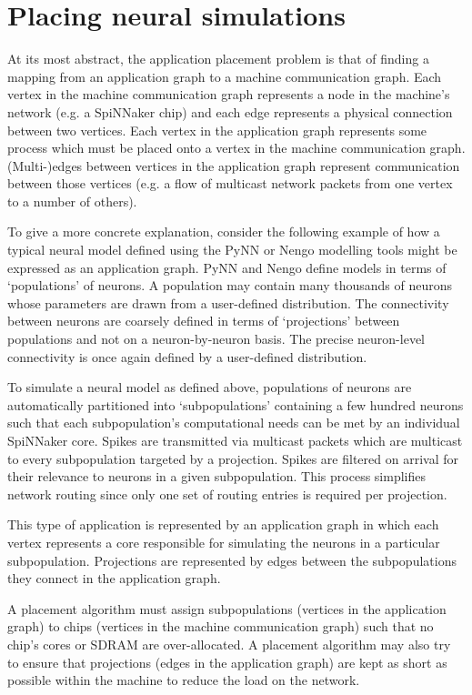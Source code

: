 	\section{Placing neural simulations}
		
		At its most abstract, the application placement problem is that of finding
		a mapping from an application graph to a machine communication graph. Each
		vertex in the machine communication graph represents a node in the
		machine's network (e.g. a SpiNNaker chip) and each edge represents a
		physical connection between two vertices. Each vertex in the application
		graph represents some process which must be placed onto a vertex in the
		machine communication graph. (Multi-)edges between vertices in the
		application graph represent communication between those vertices (e.g. a
		flow of multicast network packets from one vertex to a number of others).
		
		To give a more concrete explanation, consider the following example of how
		a typical neural model defined using the PyNN or Nengo modelling tools
		might be expressed as an application graph. PyNN and Nengo define models in
		terms of `populations' of neurons.  A population may contain many thousands
		of neurons whose parameters are drawn from a user-defined distribution. The
		connectivity between neurons are coarsely defined in terms of `projections'
		between populations and not on a neuron-by-neuron basis. The precise
		neuron-level connectivity is once again defined by a user-defined
		distribution.
		
		To simulate a neural model as defined above, populations of neurons are
		automatically partitioned into `subpopulations' containing a few hundred
		neurons such that each subpopulation's computational needs can be met by an
		individual SpiNNaker core. Spikes are transmitted via multicast packets
		which are multicast to every subpopulation targeted by a projection. Spikes
		are filtered on arrival for their relevance to neurons in a given
		subpopulation. This process simplifies network routing since only one set
		of routing entries is required per projection.
		
		This type of application is represented by an application graph in which
		each vertex represents a core responsible for simulating the neurons in a
		particular subpopulation. Projections are represented by edges between the
		subpopulations they connect in the application graph.
		
		A placement algorithm must assign subpopulations (vertices in the
		application graph) to chips (vertices in the machine communication graph)
		such that no chip's cores or SDRAM are over-allocated. A placement
		algorithm may also try to ensure that projections (edges in the application
		graph) are kept as short as possible within the machine to reduce the load
		on the network.
		
